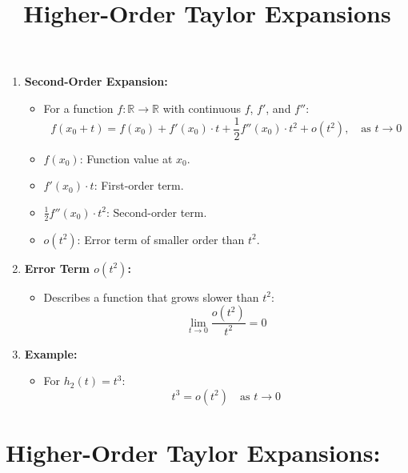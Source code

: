 \documentclass{article}
\begin{document}
\begin{enumerate}
    \item \textbf{Second-Order Expansion:}
    \begin{itemize}
        \item For a function $f : \mathbb{R} \to \mathbb{R}$ with continuous $f$, $f'$, and $f''$:
        \[
        f(x_0 + t) = f(x_0) + f'(x_0) \cdot t + \frac{1}{2} f''(x_0) \cdot t^2 + o(t^2), \quad \text{as } t \to 0
        \]
        \item $f(x_0)$: Function value at $x_0$.
        \item $f'(x_0) \cdot t$: First-order term.
        \item $\frac{1}{2} f''(x_0) \cdot t^2$: Second-order term.
        \item $o(t^2)$: Error term of smaller order than $t^2$.
    \end{itemize}
    
    \item \textbf{Error Term $o(t^2)$:}
    \begin{itemize}
        \item Describes a function that grows slower than $t^2$:
        \[
        \lim_{t \to 0} \frac{o(t^2)}{t^2} = 0
        \]
    \end{itemize}
    
    \item \textbf{Example:}
    \begin{itemize}
        \item For $h_2(t) = t^3$:
        \[
        t^3 = o(t^2) \quad \text{as } t \to 0
        \]
    \end{itemize}
\end{enumerate}











\title{Higher-Order Taylor Expansions}
\author{}
\date{}
\maketitle

\section*{Higher-Order Taylor Expansions:}
\end{document}
